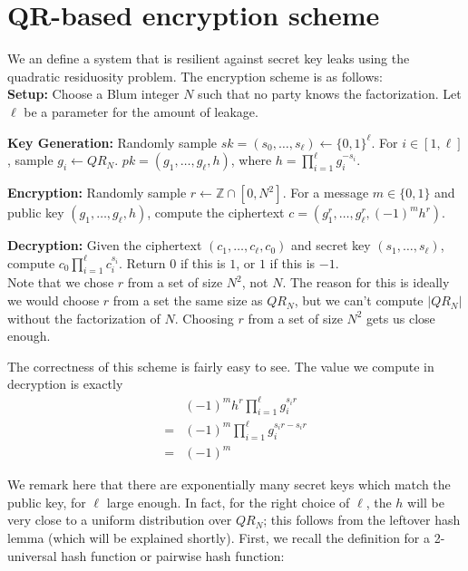 \documentclass[10pt]{article}
\begin{document}
\section{QR-based encryption scheme}

We an define a system that is resilient against secret key leaks using the quadratic residuosity problem. The encryption scheme is as follows:
\\

\textbf{Setup:} Choose a Blum integer $N$ such that no party knows the factorization. Let $\ell$ be a parameter for the amount of leakage.

\textbf{Key Generation:} Randomly sample  $sk = (s_0,\dots,s_\ell) \leftarrow \{0,1\}^\ell$. For $i \in [1,\ell]$, sample $g_i \leftarrow QR_N$. $pk = (g_1,\dots,g_\ell,h)$, where $h = \prod_{i=1}^\ell g_i^{-s_i}$.

\textbf{Encryption:} Randomly sample $r \leftarrow \mathbb{Z} \cap [0,N^2]$. For a message $m \in \{0,1\}$ and public key $(g_1,\dots,g_\ell,h)$, compute the ciphertext $c = (g_1^r,\dots,g_\ell^r,(-1)^m h^r)$. 

\textbf{Decryption:} Given the ciphertext $(c_1,\dots,c_\ell,c_0)$ and secret key $(s_1,\dots,s_\ell)$, compute $c_0 \prod_{i=1}^\ell c_i^{s_i}$. Return $0$ if this is $1$, or $1$ if this is $-1$.
\\

Note that we chose $r$ from a set of size $N^2$, not $N$. The reason for this is ideally we would choose $r$ from a set the same size as $QR_N$, but we can't compute $|QR_N|$ without the factorization of $N$. Choosing $r$ from a set of size $N^2$ gets us close enough.

The correctness of this scheme is fairly easy to see. The value we compute in decryption is exactly 
\begin{align*}
&(-1)^m h^r \prod_{i=1}^\ell g_i^{s_i r}
\\ = &(-1)^m \prod_{i=1}^\ell g_i^{s_i r - s_i r}
\\ = &(-1)^m
\end{align*}

We remark here that there are exponentially many secret keys which match the public key, for $\ell$ large enough. In fact, for the right choice of $\ell$, the $h$ will be very close to a uniform distribution over $QR_N$; this follows from the leftover hash lemma (which will be explained shortly). First, we recall the definition for a 2-universal hash function or pairwise hash function:
\end{document}
